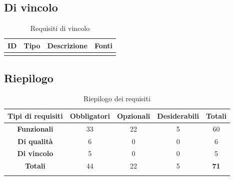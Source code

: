 \subsection{Di vincolo}
\begingroup
\renewcommand{\arraystretch}{1.50}
\begin{center}
    \begin{xltabular}{\textwidth}{|c|c| >{\arraybackslash}X|c|}
        \hline
        \textbf{ID} & \textbf{Tipo} & \textbf{Descrizione} & \textbf{Fonti} \\
        \hline
        \caption{Requisiti di vincolo}
    \end{xltabular}
\end{center}
\endgroup

\subsection{Riepilogo}
\begingroup
\renewcommand{\arraystretch}{1.50}
\begin{center}
    \begin{xltabular}{\textwidth}{| c | c | c | c | c |}
        \hline
        \textbf{Tipi di requisiti} & \textbf{Obbligatori} & \textbf{Opzionali} & \textbf{Desiderabili} & \textbf{Totali} \\
        \hline
        \textbf{Funzionali} & 33 & 22 & 5 & 60 \\
        \hline
        \textbf{Di qualità} & 6 & 0 & 0 & 6 \\
        \hline
        \textbf{Di vincolo} & 5 & 0 & 0 & 5 \\
        \hline
        \textbf{Totali} & 44 & 22 & 5 & \textbf{71} \\
        \hline
        \caption{Riepilogo dei requisiti}
    \end{xltabular}
\end{center}
\endgroup